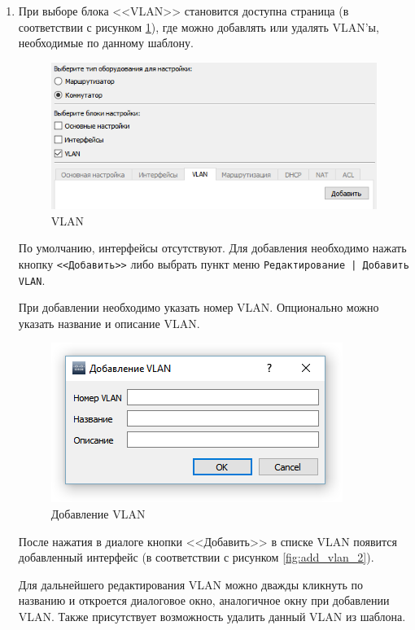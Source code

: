 \begin{enumerate}
\begin{enumerate}
\item 
При выборе блока <<VLAN>> становится доступна страница (в соответствии с рисунком \ref{fig:vlan_settings}), где можно добавлять или удалять VLAN'ы, необходимые по данному шаблону.

\begin{figure}[th!]
	\centering
	\includegraphics[width=1\linewidth]{pic/vlan_settings}
	\caption{VLAN}
	\label{fig:vlan_settings}
\end{figure}

По умолчанию, интерфейсы отсутствуют. Для добавления необходимо нажать кнопку \texttt{<<Добавить>>} либо выбрать пункт меню \texttt{Редактирование | Добавить VLAN}. 

При добавлении необходимо указать номер VLAN. Опционально можно указать название и описание VLAN. 

\begin{figure}[th!]
	\centering
	\includegraphics[width=0.8\linewidth]{pic/add_vlan}
	\caption{Добавление VLAN}
	\label{fig:add_vlan}
\end{figure}

После нажатия в диалоге кнопки <<Добавить>> в списке VLAN появится добавленный интерфейс (в соответствии с рисунком \ref{fig:add_vlan_2}).

Для дальнейшего редактирования VLAN можно дважды кликнуть по названию и откроется диалоговое окно, аналогичное окну при добавлении VLAN. Также присутствует возможность удалить данный VLAN из шаблона.


\end{enumerate}
\end{enumerate}
